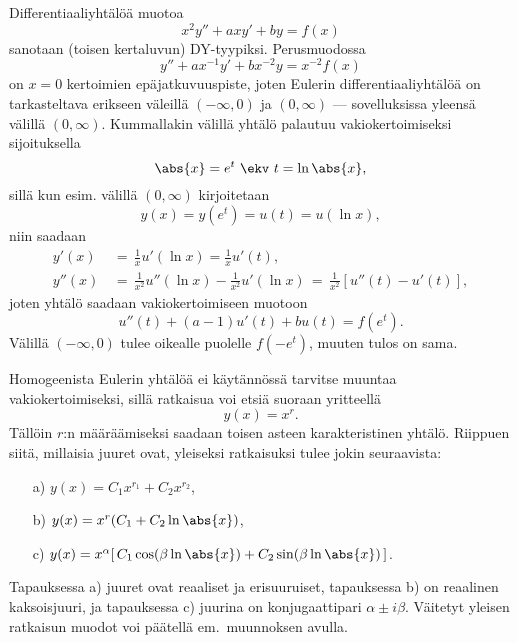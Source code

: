 Differentiaaliyhtälöä muotoa
\[
x^2y''+axy'+by=f(x)
\]
sanotaan (toisen kertaluvun)  DY-tyypiksi. Perusmuodossa
\[
y''+ax^{-1}y'+bx^{-2}y=x^{-2}f(x)
\]
on $x=0$ kertoimien epäjatkuvuuspiste, joten Eulerin differentiaaliyhtälöä on tarkasteltava
erikseen väleillä $(-\infty,0)$ ja $(0,\infty)$ --- sovelluksissa yleensä välillä $(0,\infty)$.
Kummallakin välillä yhtälö palautuu vakiokertoimiseksi sijoituksella
\[
\abs{x}=e^t \ \ekv \ t=\ln\abs{x},
\]
sillä kun esim. välillä $(0,\infty)$ kirjoitetaan
\[
y(x)=y(e^t)=u(t)=u(\ln x),
\]
niin saadaan
\begin{align*}
y'(x)  &\,=\, \frac{1}{x}u'(\ln x)=\frac{1}{x}u'(t), \\
y''(x) &\,=\, \frac{1}{x^2} u''(\ln x)-\frac{1}{x^2}u'(\ln x)
        \,=\, \frac{1}{x^2}[u''(t)-u'(t)],
\end{align*}
joten yhtälö saadaan vakiokertoimiseen muotoon
\[
u''(t)+(a-1)u'(t)+bu(t)=f(e^t).
\]
Välillä $(-\infty,0)$ tulee oikealle puolelle $f(-e^t)$, muuten tulos on sama.

Homogeenista Eulerin yhtälöä ei käytännössä tarvitse muuntaa vakiokertoimiseksi, sillä
ratkaisua voi etsiä suoraan yritteellä
\[
y(x)=x^r.
\]
Tällöin $r$:n määräämiseksi saadaan toisen asteen karakteristinen yhtälö. Riippuen siitä, 
millaisia juuret ovat, yleiseksi ratkaisuksi tulee jokin seuraavista:
\begin{itemize}
\item[a)] $y(x)=C_1x^{r_1}+C_2x^{r_2}$,
\item[b)] $y(x)=x^r(C_1+C_2\ln\abs{x})$,
\item[c)] $y(x)=x^\alpha[\,C_1\cos (\beta\ln\abs{x})+C_2\sin (\beta\ln\abs{x})\,]$.
\end{itemize}
Tapauksessa a) juuret ovat reaaliset ja erisuuruiset, tapauksessa b) on reaalinen kaksoisjuuri,
ja tapauksessa c) juurina on konjugaattipari $\alpha\pm i\beta$. Väitetyt yleisen ratkaisun
muodot voi päätellä em.\ muunnoksen avulla.

